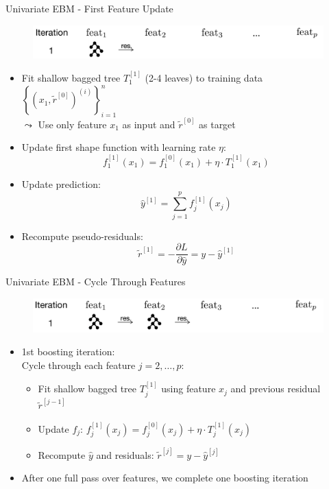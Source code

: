 \documentclass[10pt,compress,t,notes=noshow, xcolor=table]{beamer}
\begin{document}
\begin{frame}{Univariate EBM - First Feature Update}
\begin{figure}
    \centering
    \includegraphics[width=\linewidth]{figure/EBM_Step1.png}
\end{figure}
\begin{itemize}
    \item Fit shallow bagged tree $T_1^{[1]}$ (2-4 leaves) to training data $\left\{\left(x_1, \tilde{r}^{[0]}\right)^{(i)}\right\}_{i=1}^n$\\
    $\leadsto$ Use only feature $x_1$ as input and $\tilde{r}^{[0]}$ as target
    \item Update first shape function with learning rate $\eta$:
    $$
    f_1^{[1]}(x_1) = f_1^{[0]}(x_1) + \eta \cdot T_1^{[1]}(x_1)
    $$
    \item Update prediction:
    $$
    \hat{y}^{[1]} = \sum_{j=1}^p f_j^{[1]}(x_j)
    $$
    \item Recompute pseudo-residuals:
    $$
    \tilde{r}^{[1]} =  -\frac{\partial L}{\partial \hat{y}} = y - \hat{y}^{[1]}
    $$
\end{itemize}

\end{frame}


\begin{frame}{Univariate EBM - Cycle Through Features}
\begin{figure}
    \centering
    \includegraphics[width=\linewidth]{figure/EBM_Step2.png}
\end{figure}
\begin{itemize}
    \item 1st boosting iteration: \\
    Cycle through each feature $j = 2,\dots,p$:
    \begin{itemize}
        \item Fit shallow bagged tree $T_j^{[1]}$ using feature $x_j$ and previous residual $\tilde{r}^{[j-1]}$ %
        \item Update $f_j$: $f_j^{[1]}(x_j) = f_j^{[0]}(x_j) + \eta \cdot T_j^{[1]}(x_j)$
        \item Recompute $\hat{y}$ and residuals: $\tilde{r}^{[j]} = y - \hat{y}^{[j]}$
    \end{itemize}
    \item After one full pass over features, we complete one boosting iteration
\end{itemize}
\end{frame}
\end{document}
